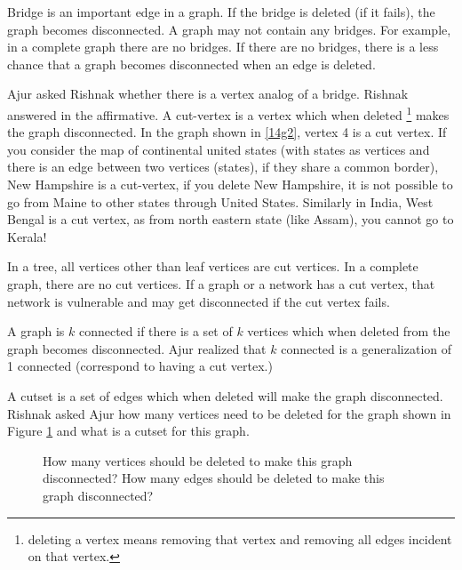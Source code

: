 Bridge is an important edge in a graph. If the bridge is deleted (if it fails), the graph becomes disconnected. A graph may not contain any bridges. For example, in a complete graph there are no
bridges. If there are no bridges, there is a less chance that a graph becomes disconnected when an edge is deleted.

Ajur asked Rishnak whether there is a vertex analog of a bridge. Rishnak answered in the affirmative. A cut-vertex is a vertex which when deleted \footnote{deleting a vertex means removing that vertex and removing all edges incident on that vertex.} makes the graph disconnected. In the graph shown in \ref{14g2}, vertex 4 is a cut vertex. If you consider the map of continental united states (with states as vertices and there is an edge between two vertices (states), if they share a common border), New Hampshire is a cut-vertex, if you delete New Hampshire, it is not possible to go from Maine to other states through United States. Similarly in India, West Bengal is  a cut vertex, as from north eastern state (like Assam), you cannot go to Kerala!

In a tree, all vertices other than leaf vertices are cut vertices. In a complete graph, there are no cut vertices. If a graph or a network has a cut vertex, that network is vulnerable and may get disconnected if the cut vertex fails. 

A graph is $k$ connected if there is a set of $k$ vertices which when deleted from the graph becomes disconnected. Ajur realized that $k$ connected is a generalization of 1 connected (correspond to having a cut vertex.)

A cutset is a set of edges which when deleted will make the graph disconnected. Rishnak asked Ajur how many vertices need to be deleted for the graph shown in Figure \ref{14g3} and what is a cutset for this graph.

\begin{figure}
\begin{center}

\caption{How many vertices should be deleted to make this graph disconnected? How many edges should be deleted to make this graph disconnected? }\label{14g3}
\end{center}
\end{figure}

